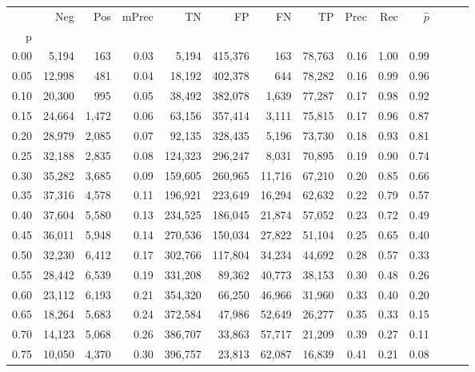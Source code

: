 \begin{tabular}{rrrrrrrrrrrrrr}
\toprule
{} &     Neg &    Pos & mPrec &       TN &       FP &      FN &      TP &  Prec &   Rec & $\hat{p}$ \\
p    &         &        &       &          &          &         &         &       &       &           \\
\midrule
0.00 &   5,194 &    163 &  0.03 &    5,194 &  415,376 &     163 &  78,763 &  0.16 &  1.00 &      0.99 \\
0.05 &  12,998 &    481 &  0.04 &   18,192 &  402,378 &     644 &  78,282 &  0.16 &  0.99 &      0.96 \\
0.10 &  20,300 &    995 &  0.05 &   38,492 &  382,078 &   1,639 &  77,287 &  0.17 &  0.98 &      0.92 \\
0.15 &  24,664 &  1,472 &  0.06 &   63,156 &  357,414 &   3,111 &  75,815 &  0.17 &  0.96 &      0.87 \\
0.20 &  28,979 &  2,085 &  0.07 &   92,135 &  328,435 &   5,196 &  73,730 &  0.18 &  0.93 &      0.81 \\
0.25 &  32,188 &  2,835 &  0.08 &  124,323 &  296,247 &   8,031 &  70,895 &  0.19 &  0.90 &      0.74 \\
0.30 &  35,282 &  3,685 &  0.09 &  159,605 &  260,965 &  11,716 &  67,210 &  0.20 &  0.85 &      0.66 \\
0.35 &  37,316 &  4,578 &  0.11 &  196,921 &  223,649 &  16,294 &  62,632 &  0.22 &  0.79 &      0.57 \\
0.40 &  37,604 &  5,580 &  0.13 &  234,525 &  186,045 &  21,874 &  57,052 &  0.23 &  0.72 &      0.49 \\
0.45 &  36,011 &  5,948 &  0.14 &  270,536 &  150,034 &  27,822 &  51,104 &  0.25 &  0.65 &      0.40 \\
0.50 &  32,230 &  6,412 &  0.17 &  302,766 &  117,804 &  34,234 &  44,692 &  0.28 &  0.57 &      0.33 \\
0.55 &  28,442 &  6,539 &  0.19 &  331,208 &   89,362 &  40,773 &  38,153 &  0.30 &  0.48 &      0.26 \\
0.60 &  23,112 &  6,193 &  0.21 &  354,320 &   66,250 &  46,966 &  31,960 &  0.33 &  0.40 &      0.20 \\
0.65 &  18,264 &  5,683 &  0.24 &  372,584 &   47,986 &  52,649 &  26,277 &  0.35 &  0.33 &      0.15 \\
0.70 &  14,123 &  5,068 &  0.26 &  386,707 &   33,863 &  57,717 &  21,209 &  0.39 &  0.27 &      0.11 \\
0.75 &  10,050 &  4,370 &  0.30 &  396,757 &   23,813 &  62,087 &  16,839 &  0.41 &  0.21 &      0.08 \\

\end{tabular}
